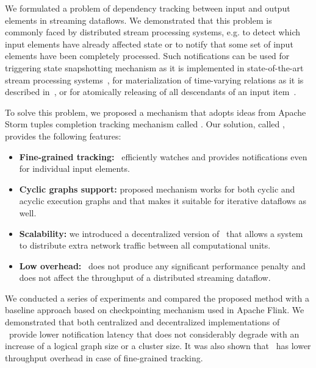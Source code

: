 \label {fs-acker-conclusion}

We formulated a problem of dependency tracking between input and output elements in streaming dataflows. We demonstrated that this problem is commonly faced by distributed stream processing systems, e.g. to detect which input elements have already affected state or to notify that some set of input elements have been completely processed. Such notifications can be used for triggering state snapshotting mechanism as it is implemented in state-of-the-art stream processing systems~\cite{Carbone:2017:SMA:3137765.3137777, apache:storm}, for materialization of time-varying relations as it is described in~\cite{Begoli:2019:OSR:3299869.3314040}, or for atomically releasing of all descendants of an input item~\cite{we2018adbis}.

To solve this problem, we proposed a mechanism that adopts ideas from Apache Storm tuples completion tracking mechanism called \acker. Our solution, called \tracker, provides the following features:
\begin{itemize}
    \item {\bf Fine-grained tracking:} \tracker\ efficiently watches and provides notifications even for individual input elements.
    \item {\bf Cyclic graphs support:} proposed mechanism works for both cyclic and acyclic execution graphs and that makes it suitable for iterative dataflows as well. 
    \item {\bf Scalability:} we introduced a decentralized version of \tracker\ that allows a system to distribute extra network traffic between all computational units. 
    \item {\bf Low overhead:} \tracker\ does not produce any significant performance penalty and does not affect the throughput of a distributed streaming dataflow.
\end{itemize}

We conducted a series of experiments and compared the proposed method with a baseline approach based on checkpointing mechanism used in Apache Flink. We demonstrated that both centralized and decentralized implementations of \tracker\ provide lower notification latency that does not considerably degrade with an increase of a logical graph size or a cluster size. It was also shown that \tracker\ has lower throughput overhead in case of fine-grained tracking.

